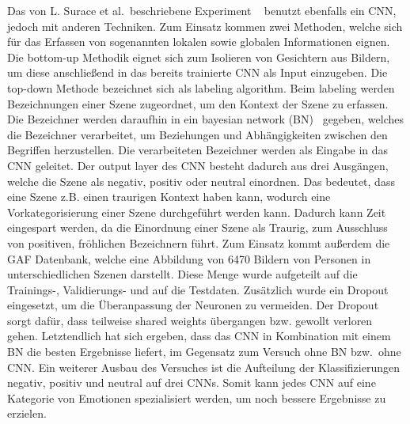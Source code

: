 Das von L. Surace et al.~beschriebene Experiment ~\cite{wildemotionrec} benutzt ebenfalls ein CNN, jedoch mit anderen Techniken. Zum Einsatz kommen zwei Methoden, welche sich für das Erfassen von sogenannten lokalen sowie globalen Informationen eignen. Die bottom-up Methodik eignet sich zum Isolieren von Gesichtern aus Bildern, um diese anschließend in das bereits trainierte CNN als Input einzugeben. Die top-down Methode bezeichnet sich als labeling algorithm. Beim labeling werden Bezeichnungen einer Szene zugeordnet, um den Kontext der Szene zu erfassen.\\Die Bezeichner werden daraufhin in ein bayesian network (BN)~\cite{wildemotionrec} gegeben, welches die Bezeichner verarbeitet, um Beziehungen und Abhängigkeiten zwischen den Begriffen herzustellen. Die verarbeiteten Bezeichner werden als Eingabe in das CNN geleitet. Der output layer des CNN besteht dadurch aus drei Ausgängen, welche die Szene als negativ, positiv oder neutral einordnen. Das bedeutet, dass eine Szene z.B. einen traurigen Kontext haben kann, wodurch eine Vorkategorisierung einer Szene durchgeführt werden kann. Da\-durch kann Zeit eingespart werden, da die Einordnung einer Szene als Traurig, zum Ausschluss von positiven, fröhlichen Bezeichnern führt. Zum Einsatz kommt außerdem die GAF Datenbank, welche eine Abbildung von 6470 Bildern von Personen in unterschiedlichen Szenen darstellt. Diese Menge wurde aufgeteilt auf die Trainings-, Validierungs- und auf die Testdaten. Zusätzlich wurde ein Dropout eingesetzt, um die Überanpassung der Neuronen zu vermeiden. Der Dropout sorgt dafür, dass teilweise shared weights übergangen bzw. gewollt verloren gehen. Letztendlich hat sich ergeben, dass das CNN in Kombination mit einem BN die besten Ergebnisse liefert, im Gegensatz zum Versuch ohne BN bzw.~ohne CNN. Ein weiterer Ausbau des Versuches ist die Aufteilung der Klassifizierungen negativ, positiv und neutral auf drei CNNs. Somit kann jedes CNN auf eine Kategorie von Emotionen spezialisiert werden, um noch bessere Ergebnisse zu erzielen.

